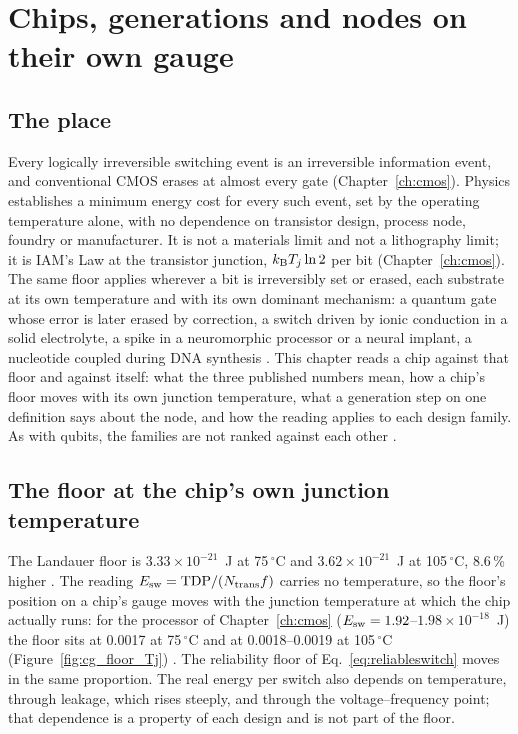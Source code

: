 \chapter{Chips, generations and nodes on their own gauge}\label{ch:chipgen}

\section*{The place}
Every logically irreversible switching event is an irreversible information event, and conventional CMOS erases at almost every gate (Chapter~\ref{ch:cmos}). Physics establishes a minimum energy cost for every such
event, set by the operating temperature alone, with no dependence on transistor design, process node, foundry or manufacturer. It is not a
materials limit and not a lithography limit; it is IAM's Law at the transistor junction, $k_{\mathrm B} T_j\ln2$ per bit (Chapter~\ref{ch:cmos}). The same floor applies wherever a bit is irreversibly set or erased, each substrate at its own temperature and with its own dominant
mechanism: a quantum gate whose error is later erased by correction, a switch driven by ionic conduction in a solid electrolyte, a spike in
a neuromorphic processor or a neural implant, a nucleotide coupled during DNA synthesis \interp. This
chapter reads a chip against that floor and against itself: what the three published numbers mean, how a chip's floor moves with its own
junction temperature, what a generation step on one definition says about the node, and how the reading applies to each design family. As
with qubits, the families are not ranked against each other \interp.

\section{The floor at the chip's own junction temperature}\label{sec:cg_floor}
The Landauer floor is $3.33\times10^{-21}$~J at 75\,$^\circ$C and $3.62\times10^{-21}$~J at 105\,$^\circ$C, 8.6\,\% higher \calc. The reading
$E_{\rm sw}=\mathrm{TDP}/(N_{\rm trans}f)$ carries no temperature, so the floor's position on a chip's gauge moves with the junction
temperature at which the chip actually runs: for the processor of Chapter~\ref{ch:cmos} ($E_{\rm sw}=1.92$--$1.98\times10^{-18}$~J) the floor
sits at 0.0017 at 75\,$^\circ$C and at 0.0018--0.0019 at 105\,$^\circ$C (Figure~\ref{fig:cg_floor_Tj}) \calc. The reliability floor of
Eq.~\eqref{eq:reliableswitch} moves in the same proportion. The real energy per switch also depends on temperature, through leakage, which
rises steeply, and through the voltage--frequency point; that dependence is a property of each design and is not part of the floor.

